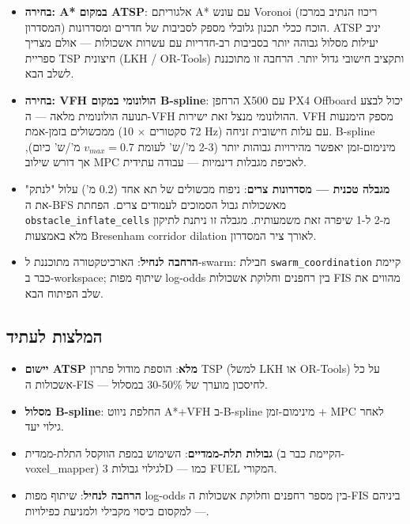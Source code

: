 \documentclass[11pt,a4paper]{article}
\begin{document}
\begin{itemize}
    \item \textbf{בחירה: \textenglish{A*} במקום \textenglish{ATSP}}: אלגוריתם \textenglish{A*} עם עונש \textenglish{Voronoi} (ריכוז הנתיב במרכז המסדרון) הוכח ככלי תכנון גלובלי מספק לסביבות של חדרים ומסדרונות. \textenglish{ATSP} יניב יעילות מסלול גבוהה יותר בסביבות רב-חדריות עם עשרות אשכולות — אולם מצריך ספריית \textenglish{TSP} חיצונית (\textenglish{LKH / OR-Tools}) ותקציב חישובי גדול יותר. הרחבה זו מתוכננת לשלב הבא.

    \item \textbf{בחירה: \textenglish{VFH} הולונומי במקום \textenglish{B-spline}}: הרחפן \textenglish{X500} עם \textenglish{PX4 Offboard} יכול לבצע תנועה הולונומית מלאה — ה-\textenglish{VFH} ההולונומי מנצל זאת ישירות. \textenglish{VFH} מספק הימנעות ממכשולים בזמן-אמת (72 סקטורים $\times$ 10 \textenglish{Hz}) עם עלות חישובית זניחה. \textenglish{B-spline} מינימום-זמן יאפשר מהירויות גבוהות יותר (2-3 מ'/ש' לעומת $v_{max}=0.7$ מ'/ש' כיום), אך דורש שילוב \textenglish{MPC} לאכיפת מגבלות דינמיות — עבודה עתידית.

    \item \textbf{מגבלה טכנית — מסדרונות צרים}: ניפוח מכשולים של תא אחד (0.2 מ') עלול "לנתק" את ה-\textenglish{BFS} מאשכולות גבול הסמוכים לעמודים צרים. הפחתת \texttt{obstacle\_inflate\_cells} מ-2 ל-1 שיפרה זאת משמעותית. מגבלה זו ניתנת לתיקון מלא באמצעות \textenglish{Bresenham corridor dilation} לאורך ציר המסדרון.

    \item \textbf{הרחבה לנחיל}: הארכיטקטורה מתוכננת ל-\textenglish{swarm}: חבילת \texttt{\textenglish{swarm\_coordination}} קיימת כבר ב-\textenglish{workspace}; שיתוף מפות \textenglish{log-odds} בין רחפנים וחלוקת אשכולות \textenglish{FIS} מהווים את שלב הפיתוח הבא.
\end{itemize}

\subsection{המלצות לעתיד}

\begin{itemize}
    \item \textbf{יישום \textenglish{ATSP} מלא}: הוספת מודול פתרון \textenglish{TSP} (למשל \textenglish{LKH} או \textenglish{OR-Tools}) על כל אשכולות ה-\textenglish{FIS} — לחיסכון מוערך של 30-50\% במסלול.

    \item \textbf{מסלול \textenglish{B-spline}}: החלפת ניווט \textenglish{A*}+\textenglish{VFH} ב-\textenglish{B-spline} מינימום-זמן + \textenglish{MPC} לאחר גילוי יעד.

    \item \textbf{גבולות תלת-ממדיים}: השימוש במפת הווקסל התלת-ממדית (הקיימת כבר ב-\textenglish{voxel\_mapper}) לגילוי גבולות 3D — כמו \textenglish{FUEL} המקורי.

    \item \textbf{הרחבה לנחיל}: שיתוף מפות \textenglish{log-odds} בין מספר רחפנים וחלוקת אשכולות ה-\textenglish{FIS} ביניהם — למקסום כיסוי מקבילי ולמניעת כפילויות.
\end{itemize}
\end{document}
